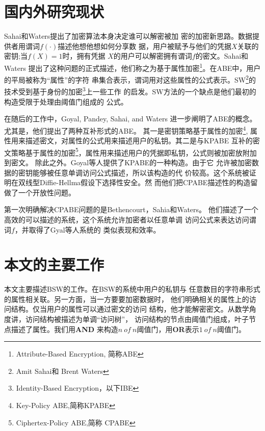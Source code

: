 \section{国内外研究现状}
Sahai和Waters\cite{SW:FuzzyIBE}提出了加密算法本身决定谁可以解密被加
密的加密新思路。数据提供者用谓词$f(\cdot)$描述他想他想如何分享数
据，用户被赋予与他们的凭据$X$关联的密钥;当$f(X)=1$时，拥有凭据
$X$的用户可以解密拥有谓词$f$的密文。Sahai和Waters\cite{SW:FuzzyIBE}
提出了这种问题的正式描述，他们称之为基于属性加密\footnote{Attribute-Based 
Encryption, 简称ABE}。在ABE中，用户的平局被称为“属性”的字符
串集合表示，谓词用对这些属性的公式表示。SW\footnote{Amit Sahai和
Brent Waters}的技术受到基于身份的加密\footnote{Identity-Based 
Encryption，以下IBE}上一些工作\cite{Shamir:IBC,BF:IBE,Cocks:IBE,CHK:fspk,BB:IBE}
的启发。SW方法的一个缺点是他们最初的构造受限于处理由阈值门组成的
公式。\par
在随后的工作中，Goyal, Pandey, Sahai, and Waters\cite{GPSW:ABE}
进一步阐明了ABE的概念。尤其是，他们提出了两种互补形式的ABE。
其一是密钥策略基于属性的加密\footnote{Key-Policy ABE,简称KPABE},
属性用来描述密文，对属性的公式用来描述用户的私钥。其二是与KPABE
互补的密文策略基于属性的加密\footnote{Ciphertex-Policy ABE,简称
CPABE}，属性用来描述用户的凭据即私钥，公式则被加密放附加到密文。
除此之外。Goyal等人\cite{GPSW:ABE}提供了KPABE的一种构造。由于它
允许被加密数据的密钥能够被任意单调访问公式描述，所以该构造的代
价较高。这个系统被证明在双线型Diffie-Hellma假设下选择性安全。然
而他们把CPABE描述性的构造留做了一个开放性问题。\par
第一次明确解决CPABE问题的是Bethencourt，Sahia和Waters\cite{BSW:CPABE}。
他们描述了一个高效的可以描述的系统，这个系统允许加密者以任意单调
访问公式来表达访问谓词$f$，并取得了Gyal等人\cite{GPSW:ABE}系统的
类似表现和效率。
\section{本文的主要工作}
本文主要描述BSW的工作\cite{BSW:CPABE}。在BSW的系统中用户的私钥与
任意数目的字符串形式的属性相关联。另一方面，当一方要要加密数据时，
他们明确相关的属性上的访问结构。仅当用户的属性可以通过密文的访问
结构，他才能解密密文。从数学角度讲，访问结构被描述为单调“访问树”，
访问结构的节点由阈值门组成，叶子节点描述了属性。我们用\textbf{AND}
来构造$n\ of\ n$阈值门，用\textbf{OR}表示$1\ of\ n$阈值门。

